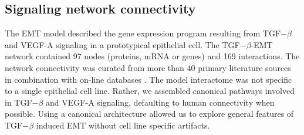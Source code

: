 \documentclass[11pt,letterpaper]{article}
\begin{document}
\subsection*{Signaling network connectivity}
The EMT model described the gene expression program resulting from TGF$-\beta$ and VEGF-A signaling in a prototypical epithelial cell.
The TGF$-\beta$-EMT network contained 97 nodes (proteins, mRNA or genes) and 169 interactions.
The network connectivity was curated from more than 40 primary literature sources in combination with on-line databases \cite{Linding:2007fk,Jensen:2009fk}.
The model interactome was not specific to a single epithelial cell line.
Rather, we assembled canonical pathways involved in TGF$-\beta$ and VEGF-A signaling, defaulting to human connectivity when possible.
Using a canonical architecture allowed us to explore general features of TGF$-\beta$ induced EMT without cell line specific artifacts.
\end{document}
